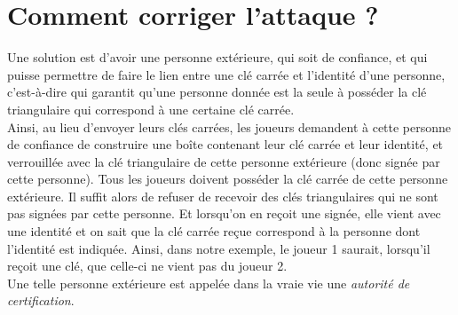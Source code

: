 \documentclass[a4paper,10pt]{article}
\begin{document}
\section{Comment corriger l'attaque ?}
Une solution est d'avoir une personne extérieure, qui soit de confiance, et qui puisse permettre de faire le lien entre une clé carrée et l'identité d'une personne, c'est-à-dire qui garantit qu'une personne donnée est la seule à posséder la clé triangulaire qui correspond à une certaine clé carrée.\\Ainsi, au lieu d'envoyer leurs clés carrées, les joueurs demandent à cette personne de confiance de construire une boîte contenant leur clé carrée et leur identité, et verrouillée avec la clé triangulaire de cette personne extérieure (donc signée par cette personne). Tous les joueurs doivent posséder la clé carrée de cette personne extérieure. Il suffit alors de refuser de recevoir des clés triangulaires qui ne sont pas signées par cette personne. Et lorsqu'on en reçoit une signée, elle vient avec une identité et on sait que la clé carrée reçue correspond à la personne dont l'identité est indiquée. Ainsi, dans notre exemple, le joueur 1 saurait, lorsqu'il reçoit une clé, que celle-ci ne vient pas du joueur 2. \\
Une telle personne extérieure est appelée dans la vraie vie une \emph{autorité de certification}.
\end{document}
